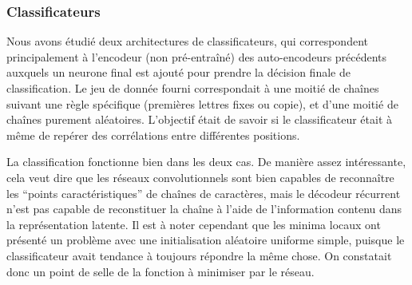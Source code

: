 \documentclass[a4paper, 11pt, onecolumn]{article}
\begin{document}
\subsubsection{Classificateurs}

Nous avons étudié deux architectures de classificateurs, qui correspondent
principalement à l'encodeur (non pré-entraîné) des auto-encodeurs précédents auxquels un neurone
final est ajouté pour prendre la décision finale de classification. Le jeu de
donnée fourni correspondait à une moitié de chaînes suivant une règle spécifique
(premières lettres fixes ou copie), et d'une moitié de chaînes purement
aléatoires. L'objectif était de savoir si le classificateur était à même de
repérer des corrélations entre différentes positions.

La classification fonctionne bien dans les deux cas. De manière assez
intéressante, cela veut dire que les réseaux convolutionnels sont bien capables
de reconnaître les ``points caractéristiques'' de chaînes de caractères, mais le
décodeur récurrent n'est pas capable de reconstituer la chaîne à l'aide de
l'information contenu dans la représentation latente. Il est à noter cependant
que les minima locaux ont présenté un problème avec une initialisation
aléatoire uniforme simple, puisque le classificateur avait tendance à toujours
répondre la même chose. On constatait donc un point de selle de la fonction à
minimiser par le réseau.




\end{document}
